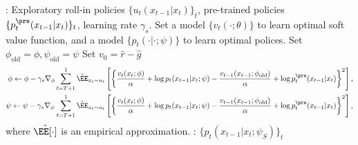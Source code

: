 \begin{algorithm}[!t]
\caption{Training with detailed balance loss}\label{alg:detailed_balance_loss}
\begin{algorithmic}[1]
 : Exploratory roll-in policies $\{u_{t}(x_{t-1}|x_t)\}_t$, pre-trained policies $\{p^{\pre}_{t}(x_{t-1}|x_t)\}_t$, learning rate $\gamma_s$. 
  \STATE Set a model $\{v_t(\cdot;\theta)\}$ to learn optimal soft value function, and a model $\{ p_t(\cdot|\cdot ;\psi)\} $ to learn optimal polices. 
      \STATE Set $\phi_{\mathrm{old}} = \phi,  \psi_{\mathrm{old}} = \psi$
      \STATE Set $v_0 = \hat r-\hat g$ 
      {\small 
     \begin{align*}
    \phi  \leftarrow \phi -\gamma_s \nabla_{\phi} \sum_{t=T+1}^1  \hat \EE_{x_t \sim u_t}\left[\left \{\frac{v_t(x_t;\phi)}{\alpha} + \log p_t(x_{t-1}|x_t;\psi) -  \frac{v_{t-1}(x_{t-1};\phi_{\mathrm{old}})}{\alpha} + \log p^{\pre}_t(x_{t-1}|x_t)  \right \}^2    
    \right ] , \\ 
     \psi  \leftarrow \psi -\gamma_s \nabla_{\psi} \sum_{t=T+1}^1  \hat \EE_{x_t \sim u_t}\left[\left \{\frac{v_t(x_t;\phi)}{\alpha} + \log p_t(x_{t-1}|x_t;\psi) - \frac{v_{t-1}(x_{t-1};\phi_{\mathrm{old}})}{\alpha}  + \log p^{\pre}_t(x_{t-1}|x_t)  \right \}^2    
    \right ], 
     \end{align*}
     } 
     where $\hat \EE[\cdot]$ is an empirical approximation. 
   \ENDFOR 
  : $\{p_t(x_{t-1}|x_t;\psi_S) \}_t$
\end{algorithmic}
\end{algorithm}

